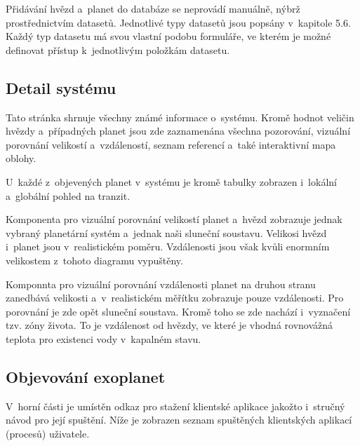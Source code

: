 \documentclass[a4paper,12pt]{article}
\begin{document}
{{{{{{{{{{{

Přidávání hvězd a~planet do databáze se neprovádí manuálně, nýbrž prostřednictvím datasetů. Jednotlivé typy datasetů jsou popsány v~kapitole 5.6. Každý typ datasetu má svou vlastní podobu formuláře, ve kterém je možné definovat přístup k~jednotlivým položkám datasetu.

\clearpage

\subsection{Detail systému}

Tato stránka shrnuje všechny známé informace o~systému. Kromě hodnot veličin hvězdy a~případných planet jsou zde zaznamenána všechna pozorování, vizuální porovnání velikostí a~vzdáleností, seznam referencí a~také interaktivní mapa oblohy.


U~každé z~objevených planet v~systému je kromě tabulky zobrazen i~lokální a~globální pohled na tranzit.



Komponenta pro vizuální porovnání velikostí planet a~hvězd zobrazuje jednak vybraný planetární systém a~jednak naši sluneční soustavu. Velikosi hvězd i~planet jsou v~realistickém poměru. Vzdálenosti jsou však kvůli enormním velikostem z~tohoto diagramu vypuštěny.


Komponnta pro vizuální porovnání vzdálenosti planet na druhou stranu zanedbává velikosti a~v~realistickém měřítku zobrazuje pouze vzdálenosti. Pro porovnání je zde opět sluneční soustava. Kromě toho se zde nachází i~vyznačení tzv. zóny života. To je vzdálenost od hvězdy, ve které je vhodná rovnovážná teplota pro existenci vody v~kapalném stavu.


\clearpage

\subsection{Objevování exoplanet}

\vspace{-8pt}

V~horní části je umístěn odkaz pro stažení klientské aplikace jakožto i~stručný návod pro její spuštění. Níže je zobrazen seznam spuštěných klientských aplikací (procesů) uživatele.

}}}}}}}}}}}
\end{document}
